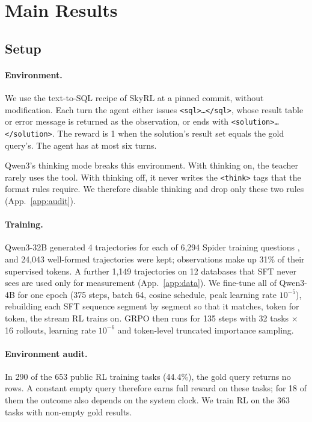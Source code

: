 \section{Main Results}
\label{sec:main}

\subsection{Setup}
\label{sec:setup}

\paragraph{Environment.}
We use the text-to-SQL recipe of SkyRL \citep{skyrl} at a pinned commit, without modification. Each turn the agent either issues \texttt{<sql>\ldots</sql>}, whose result table or error message is returned as the observation, or ends with \texttt{<solution>\ldots</solution>}. The reward is 1 when the solution's result set equals the gold query's. The agent has at most six turns.

Qwen3's thinking mode breaks this environment. With thinking on, the teacher rarely uses the tool. With thinking off, it never writes the \texttt{<think>} tags that the format rules require. We therefore disable thinking and drop only these two rules (App.~\ref{app:audit}).

\paragraph{Training.}
Qwen3-32B \citep{yang2025qwen3} generated 4 trajectories for each of 6,294 Spider training questions \citep{yu2018spider,li2025omnisql}, and 24,043 well-formed trajectories were kept; observations make up 31\% of their supervised tokens. A further 1,149 trajectories on 12 databases that SFT never sees are used only for measurement (App.~\ref{app:data}). We fine-tune all of Qwen3-4B for one epoch (375 steps, batch 64, cosine schedule, peak learning rate $10^{-5}$), rebuilding each SFT sequence segment by segment so that it matches, token for token, the stream RL trains on. GRPO \citep{shao2024deepseekmath} then runs for 135 steps with 32 tasks $\times$ 16 rollouts, learning rate $10^{-6}$ and token-level truncated importance sampling.

\paragraph{Environment audit.}
In 290 of the 653 public RL training tasks (44.4\%), the gold query returns no rows. A constant empty query therefore earns full reward on these tasks; for 18 of them the outcome also depends on the system clock. We train RL on the 363 tasks with non-empty gold results.

